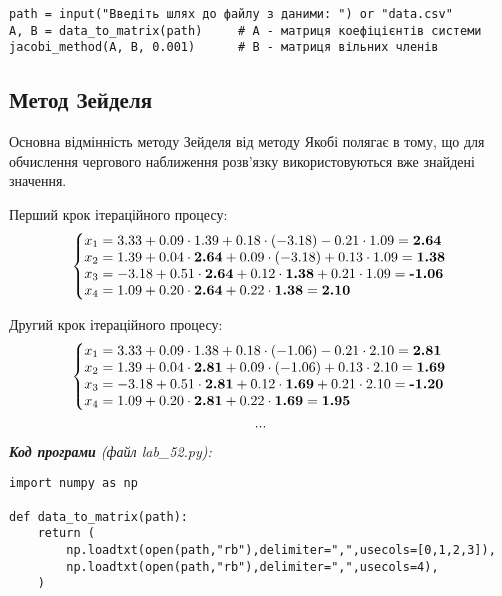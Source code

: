 \documentclass{article}
\newcommand\lab{5}
\begin{document}
\begin{large}
\begin{lstlisting}
path = input("Введіть шлях до файлу з даними: ") or "data.csv"
A, B = data_to_matrix(path)     # A - матриця коефіцієнтів системи
jacobi_method(A, B, 0.001)      # B - матриця вільних членів\end{lstlisting}
		
		\subsection*{Метод Зейделя}
		Основна відмінність методу Зейделя від методу Якобі полягає в тому, що для обчислення чергового наближення розв’язку використовуються вже знайдені значення.
		
		Перший крок ітераційного процесу:
		\begin{gather}
			\left\{\begin{array}{@{}l@{}}
				x_1=3.33+0.09\cdot1.39+0.18\cdot(-3.18)-0.21\cdot1.09=\textbf{2.64}\\\nonumber
				x_2=1.39+0.04\cdot\textbf{2.64}+0.09\cdot(-3.18)+0.13\cdot1.09=\textbf{1.38}\\\nonumber
				x_3=-3.18+0.51\cdot\textbf{2.64}+0.12\cdot\textbf{1.38}+0.21\cdot1.09=\textbf{-1.06}\\\nonumber
				x_4=1.09+0.20\cdot\textbf{2.64}+0.22\cdot\textbf{1.38}=\textbf{2.10}\nonumber
			\end{array}\right.\,
		\end{gather}
	
		Другий крок ітераційного процесу:
		\begin{gather}
			\left\{\begin{array}{@{}l@{}}
				x_1=3.33+0.09\cdot1.38+0.18\cdot(-1.06)-0.21\cdot2.10=\textbf{2.81}\\\nonumber
				x_2=1.39+0.04\cdot\textbf{2.81}+0.09\cdot(-1.06)+0.13\cdot2.10=\textbf{1.69}\\\nonumber
				x_3=-3.18+0.51\cdot\textbf{2.81}+0.12\cdot\textbf{1.69}+0.21\cdot2.10=\textbf{-1.20}\\\nonumber
				x_4=1.09+0.20\cdot\textbf{2.81}+0.22\cdot\textbf{1.69}=\textbf{1.95}\nonumber
			\end{array}\right.\,\\\nonumber
			...\nonumber
		\end{gather}
		\noindent\textit{\textbf{Код програми} (файл lab\_\lab2.py):}
		\begin{lstlisting}
import numpy as np

def data_to_matrix(path):
	return (
		np.loadtxt(open(path,"rb"),delimiter=",",usecols=[0,1,2,3]),
		np.loadtxt(open(path,"rb"),delimiter=",",usecols=4),
	)


\end{lstlisting}
\end{large}
\end{document}
